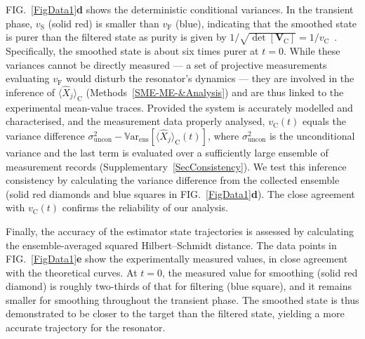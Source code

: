 \documentclass[aps,prx,twocolumn,amsmath,amssymb,superscriptaddress,floatfix,longbibliography
]{revtex4-2}
\begin{document}
FIG.~\ref{FigData1}\textbf{d} shows the deterministic conditional variances. In the transient phase, $v_\text{S}$ (solid red) is smaller than $v_\text{F}$ (blue), indicating that the smoothed state is purer than the filtered state as purity is given by $1/\sqrt{\det[\mathbf{V}_\text{C}]} = 1/v_\text{C}$~\cite{serafini2017quantum}. Specifically, the smoothed state is about six times purer at $t=0$. While these variances cannot be directly measured --- a set of projective measurements evaluating $v_\text{F}$ would disturb the resonator’s dynamics --- they are involved in the inference of $\langle\hat{X}_j\rangle_\text{C}$ (Methods~\ref{SME-ME-&Analysis}) and are thus linked to the experimental mean-value traces. Provided the system is accurately modelled and characterised, and the measurement data properly analysed, $v_\text{C}(t)$ equals the variance difference $\sigma^2_\text{uncon}-\mathbb{V}\mathrm{ar}_{\text{ens}}[\langle\hat{X}_j\rangle_\text{C}(t)]$, where $\sigma^2_\text{uncon}$ is the unconditional variance and the last term is evaluated over a sufficiently large ensemble of measurement records (Supplementary~\ref{SecConsistency}). We test this inference consistency by calculating the variance difference from the collected ensemble (solid red diamonds and blue squares in FIG.~\ref{FigData1}\textbf{d}). The close agreement with $v_\text{C}(t)$ confirms the reliability of our analysis.

Finally, the accuracy of the estimator state trajectories is assessed by calculating the ensemble-averaged squared Hilbert–Schmidt distance. The data points in FIG.~\ref{FigData1}\textbf{e} show the experimentally measured values, in close agreement with the theoretical curves. At $t=0$, the measured value for smoothing (solid red diamond) is roughly two-thirds of that for filtering (blue square), and it remains smaller for smoothing throughout the transient phase. The smoothed state is thus demonstrated to be closer to the target than the filtered state, yielding a more accurate trajectory for the resonator.

\end{document}

